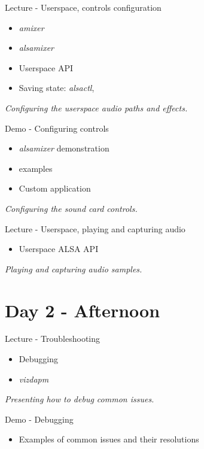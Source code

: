 \documentclass[a4paper,12pt,obeyspaces,spaces,hyphens]{article}
\begin{document}
\feagendatwocolumn
{Lecture - Userspace, controls configuration}
{
  \begin{itemize}
  \item {\em amixer}
  \item {\em alsamixer}
  \item Userspace API
  \item Saving state: {\em alsactl}, 
  \end{itemize}
  \vspace{0.5em}
  {\em Configuring the userspace audio paths and effects.}
}
{Demo - Configuring controls}
{
  \begin{itemize}
  \item {\em alsamixer} demonstration
  \item {} examples
  \item Custom application
  \end{itemize}
  \vspace{0.5em}
  {\em Configuring the sound card controls.}
}

\feagendaonecolumn
{Lecture - Userspace, playing and capturing audio}
{
  \begin{itemize}
  \item Userspace ALSA API
  \end{itemize}
  \vspace{0.5em}
  {\em Playing and capturing audio samples.}
}

\section{Day 2 - Afternoon}

\feagendatwocolumn
{Lecture - Troubleshooting}
{
  \begin{itemize}
  \item Debugging
  \item {\em vizdapm}
  \end{itemize}
  \vspace{0.5em}
  {\em Presenting how to debug common issues.}
}
{Demo - Debugging}
{
  \begin{itemize}
  \item Examples of common issues and their resolutions
  \end{itemize}
}
\end{document}

